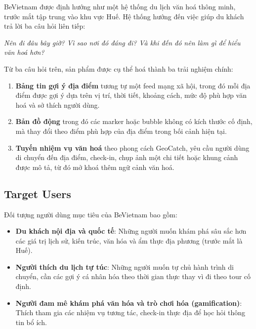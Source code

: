 BeVietnam được định hướng như một hệ thống du lịch văn hoá thông minh, trước mắt tập trung vào khu vực Huế. Hệ thống hướng đến việc giúp du khách trả lời ba câu hỏi liên tiếp:

\begin{center}
\textit{Nên đi đâu bây giờ? Vì sao nơi đó đáng đi? Và khi đến đó nên làm gì để hiểu văn hoá hơn?}
\end{center}

Từ ba câu hỏi trên, sản phẩm được cụ thể hoá thành ba trải nghiệm chính:
\begin{enumerate}[leftmargin=1.2cm]
    \item \textbf{Bảng tin gợi ý địa điểm} tương tự một feed mạng xã hội, trong đó mỗi địa điểm được gợi ý dựa trên vị trí, thời tiết, khoảng cách, mức độ phù hợp văn hoá và sở thích người dùng.
    \item \textbf{Bản đồ động} trong đó các marker hoặc bubble không có kích thước cố định, mà thay đổi theo điểm phù hợp của địa điểm trong bối cảnh hiện tại.
    \item \textbf{Tuyến nhiệm vụ văn hoá} theo phong cách GeoCatch, yêu cầu người dùng di chuyển đến địa điểm, check-in, chụp ảnh một chi tiết hoặc khung cảnh được mô tả, từ đó mở khoá thêm ngữ cảnh văn hoá.
\end{enumerate}

\subsection{Target Users}

Đối tượng người dùng mục tiêu của BeVietnam bao gồm:
\begin{itemize}
    \item \textbf{Du khách nội địa và quốc tế}: Những người muốn khám phá sâu sắc hơn các giá trị lịch sử, kiến trúc, văn hóa và ẩm thực địa phương (trước mắt là Huế).
    \item \textbf{Người thích du lịch tự túc}: Những người muốn tự chủ hành trình di chuyển, cần các gợi ý cá nhân hóa theo thời gian thực thay vì đi theo tour cố định.
    \item \textbf{Người đam mê khám phá văn hóa và trò chơi hóa (gamification)}: Thích tham gia các nhiệm vụ tương tác, check-in thực địa để học hỏi thông tin bổ ích.
\end{itemize}
